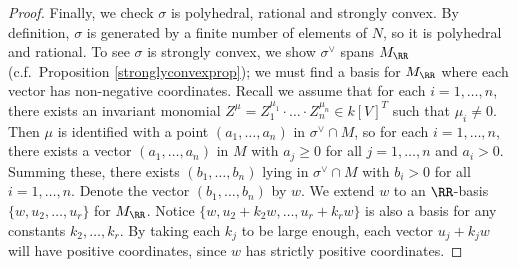 \documentclass[12pt]{amsart}
\theoremstyle{plain}
\begin{document}
\begin{proof}
Finally, we check $\sigma$ is polyhedral, rational and strongly convex.
By definition, $\sigma$ is generated by a finite number of elements of $N$, so it is polyhedral and rational.
To see $\sigma$ is strongly convex, we show $\sigma^\vee$ spans $M_\RR$ (c.f.\ Proposition \ref{stronglyconvexprop});
we must find a basis for $M_\RR$ where each vector has non-negative coordinates.
Recall we assume that for each $i=1, \ldots, n$, there exists an invariant monomial $Z^\mu = Z_1^{\mu_1} \cdot \ldots \cdot Z_n^{\mu_n} \in k[V]^T$ such that $\mu_i \ne 0$.
Then $\mu$ is identified with a point $(a_1, \ldots, a_n)$ in $\sigma^\vee \cap M$, so for each $i=1, \ldots, n$, there exists a vector $(a_1, \ldots, a_n)$ in $M$ with $a_j \ge 0$ for all $j=1, \ldots, n$ and $a_i > 0$.
Summing these, there exists $(b_1, \ldots, b_n)$ lying in $\sigma^\vee \cap M$ with $b_i > 0$ for all $i=1, \ldots, n$.
Denote the vector $(b_1, \ldots, b_n)$ by $w$.
We extend $w$ to an $\RR$-basis $\{w, u_2, \ldots, u_r\}$ for $M_\RR$.
Notice $\{w, u_2 + k_2 w, \ldots, u_r + k_r w\}$ is also a basis for any constants $k_2, \ldots, k_r$.
By taking each $k_j$ to be large enough, each vector $u_j + k_j w$ will have positive coordinates, since $w$ has strictly positive coordinates.
\end{proof}
%
\end{document}
